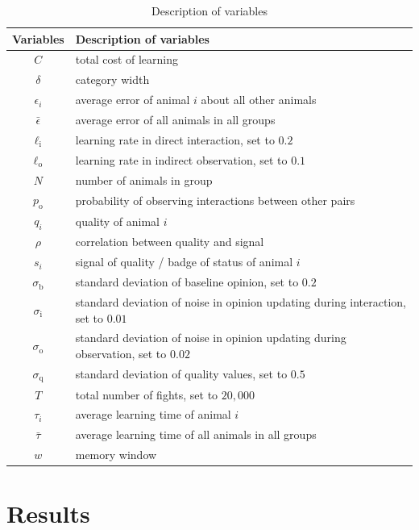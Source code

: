 %
\begin {table}[ht]
\caption {Description of variables} \label{tab:vars} 
\begin{tabular}{cl}
\toprule
 Variables & Description of variables \\
\midrule 
$C$ & total cost of learning \\ 
$\delta$ & category width \\
$\epsilon_i$ & average error of animal $i$ about all other animals \\
$\bar{\epsilon}$ & average error of all animals in all groups \\
$\ell_\text{i}$ & learning rate in direct interaction, set to $0.2$ \\
$\ell_\text{o}$ & learning rate in indirect observation, set to $0.1$ \\
$N$ & number of animals in group \\ 
$p_\text{o}$ & probability of observing interactions between other pairs \\
 $q_i$ & quality of animal $i$ \\ 
 $\rho$ & correlation between quality and signal \\
$s_i$ & signal of quality / badge of status of animal $i$ \\ 
$\sigma_\text{b}$ & standard deviation of baseline opinion, set to $0.2$ \\
$\sigma_\text{i}$ & standard deviation of noise in opinion updating during interaction, set to $0.01$ \\
$\sigma_\text{o}$ & standard deviation of noise in opinion updating during observation, set to $0.02$ \\
$\sigma_\text{q}$ & standard deviation of quality values, set to $0.5$ \\
$T$ & total number of fights, set to $20,000$ \\
$\tau_i$ & average learning time of animal $i$ \\
$\bar{\tau}$ & average learning time of all animals in all groups \\ 
$w$ & memory window \\
\bottomrule
\end{tabular}
\end {table}
%


\section*{Results}
%
